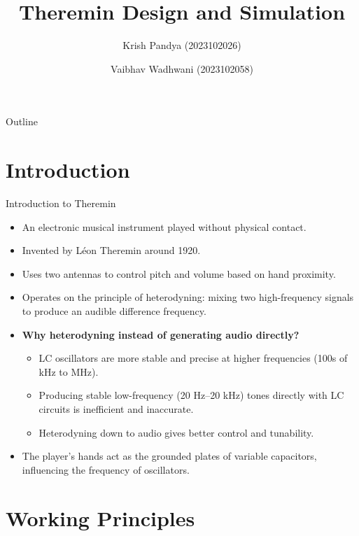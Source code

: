 \documentclass[10pt,xcolor={table,dvipsnames},t]{beamer}
\title[Theremin]{Theremin Design and Simulation}
\author{Krish Pandya (2023102026) \and Vaibhav Wadhwani (2023102058)}
\institute{IIITH}
\date{}
\begin{document}
\begin{frame}
  \titlepage
\end{frame}

\begin{frame}{Outline}
  \tableofcontents
\end{frame}

\section{Introduction}

\begin{frame}{Introduction to Theremin}
\begin{itemize}
    \item An electronic musical instrument played without physical contact.
    \item Invented by L\'{e}on Theremin around 1920.
    \item Uses two antennas to control pitch and volume based on hand proximity.
    \item Operates on the principle of heterodyning: mixing two high-frequency signals to produce an audible difference frequency.
    \item \textbf{Why heterodyning instead of generating audio directly?}
    \begin{itemize}
        \item LC oscillators are more stable and precise at higher frequencies (100s of kHz to MHz).
        \item Producing stable low-frequency (20 Hz–20 kHz) tones directly with LC circuits is inefficient and inaccurate.
        \item Heterodyning down to audio gives better control and tunability.
    \end{itemize}
    \item The player's hands act as the grounded plates of variable capacitors, influencing the frequency of oscillators.
\end{itemize}
\end{frame}

\section{Working Principles}
\end{document}

